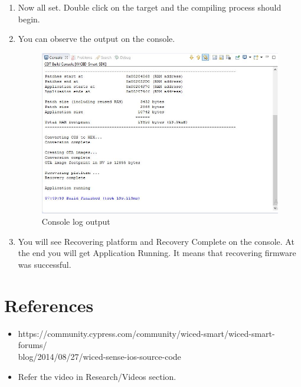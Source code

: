 \documentclass[11pt,a4paper]{article}
\begin{document}
\begin{enumerate}
	   \newpage
    \item Now all set. Double click on the target and the compiling process should begin.
    \item You can observe the output on the console.
    
    \begin{figure}[h]
        \centering
    	\includegraphics[scale=0.5]{recovery_complete.JPG}
    	\caption{Console log output}
	    \end{figure}
	    
    \item You will see Recovering platform and Recovery Complete on the console. At the end you will get Application Running. It means that recovering firmware was successful.

 
 	\end{enumerate}
 
 \newpage
	\section{References}
	 \begin{itemize}
	 \item https://community.cypress.com/community/wiced-smart/wiced-smart-forums/\\blog/2014/08/27/wiced-sense-ios-source-code
	 \item Refer the video in Research/Videos section.
	    \end{itemize}
 
 
\end{document}
